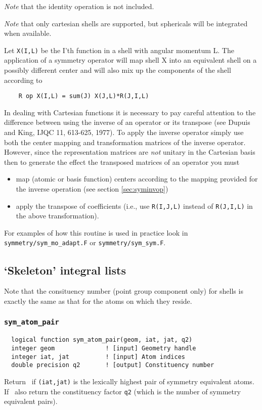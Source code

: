 {\em Note} that the identity operation is not included.

{\em Note} that only cartesian shells are supported, but sphericals
will be integrated when available.

Let \verb+X(I,L)+ be the I'th function in a shell with angular
momentum L.  The application of a symmetry operator will
map shell X into an equivalent shell on a possibly different
center and will also mix up the components of the shell
according to
\begin{verbatim}
    R op X(I,L) = sum(J) X(J,L)*R(J,I,L)
\end{verbatim}

In dealing with Cartesian functions it is necessary to pay careful
attention to the difference between using the inverse of an operator
or its transpose
(see Dupuis and King, IJQC 11, 613-625, 1977).  To apply the inverse
operator simply use both the center mapping and transformation
matrices of the inverse operator.  However, since the representation
matrices are {\em not} unitary in the Cartesian basis then to generate
the effect the transposed matrices of an operator you must
\begin{itemize}
\item map (atomic or basis function) centers according to the mapping
  provided for the inverse operation (see section \ref{sec:syminvop})
\item apply the transpose of coefficients (i.e., use \verb+R(I,J,L)+
  instead of \verb+R(J,I,L)+ in the above transformation).
\end{itemize}

For examples of how this routine is used in practice look in
\verb+symmetry/sym_mo_adapt.F+ or \verb+symmetry/sym_sym.F+.

\subsection{`Skeleton' integral lists}

Note that the consituency number (point group component only) for
shells is exactly the same as that for the atoms on which they reside.

\subsubsection{{\tt sym\_atom\_pair}}
\begin{verbatim}
  logical function sym_atom_pair(geom, iat, jat, q2)
  integer geom              ! [input] Geometry handle
  integer iat, jat          ! [input] Atom indices
  double precision q2       ! [output] Constituency number
\end{verbatim}
Return \TRUE\ if \verb+(iat,jat)+ is the lexically highest pair of
symmetry equivalent atoms. If \TRUE\ also return the constituency
factor \verb+q2+ (which is the number of symmetry equivalent pairs).

